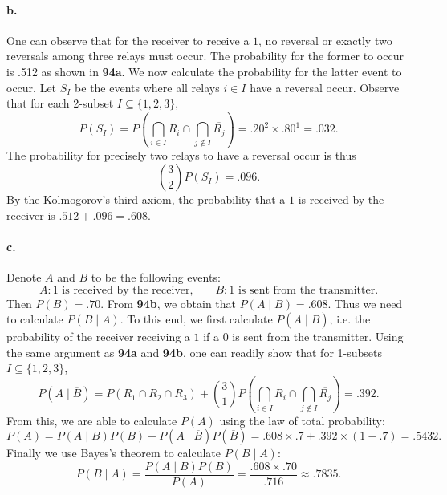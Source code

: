 \documentclass{exam}
\newcommand{\paren}[1]{\left(#1\right)}
\begin{document}
\paragraph{b.} One can observe that for the receiver to receive a $1$, no reversal or exactly two reversals among three relays must occur. The probability for the former to occur is .512 as shown in \textbf{94a}. We now calculate the probability for the latter event to occur. Let $S_I$ be the events where all relays $i \in I$ have a reversal occur. Observe that for each 2-subset $I \subseteq \{1, 2, 3\}$,
\[
	P(S_I) = P\paren{\bigcap_{i \in I} R_i \cap \bigcap_{j \notin I} \overline{R_j}} = .20^2 \times .80^1 = .032.
\]
The probability for precisely two relays to have a reversal occur is thus
\[
	\binom32 P(S_I) = .096.
\]
By the Kolmogorov's third axiom, the probability that a $1$ is received by the receiver is $.512 + .096 = .608$.

\paragraph{c.} Denote $A$ and $B$ to be the following events:
\[
	A: \text{1 is received by the receiver,} \qquad B: \text{1 is sent from the transmitter}.
\]
Then $P(B) = .70$. From \textbf{94b}, we obtain that $P(A \mid B) = .608$. Thus we need to calculate $P(B \mid A)$. To this end, we first calculate $P(A \mid \overline{B})$, i.e. the probability of the receiver receiving a $1$ if a $0$ is sent from the transmitter. Using the same argument as \textbf{94a} and \textbf{94b}, one can readily show that for 1-subsets $I \subseteq \{1, 2, 3\}$,
\[
	P(A \mid \overline{B}) = P(R_1 \cap R_2 \cap R_3) + \binom31 P\paren{\bigcap_{i \in I} R_i \cap \bigcap_{j \notin I} \overline{R_j}} = .392.
\]
From this, we are able to calculate $P(A)$ using the law of total probability:
\[
	P(A) = P(A \mid B)P(B) + P(A \mid \overline{B})P(\overline{B}) = .608 \times .7 + .392 \times (1 - .7) = .5432.
\]
Finally we use Bayes's theorem to calculate $P(B \mid A)$:
\[
	P(B \mid A) = \frac{P(A \mid B)P(B)}{P(A)} = \frac{.608 \times .70}{.716} \approx .7835.
\]
\end{document}
